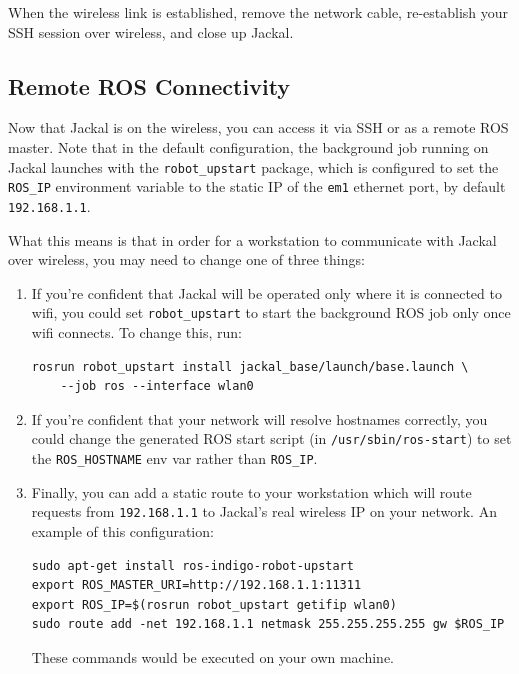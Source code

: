 \documentclass[]{clearpath-latex/clearpath-manual}
\begin{document}
When the wireless link is established, remove the network cable, re-establish your SSH
session over wireless, and close up Jackal.

\subsection{Remote ROS Connectivity}\label{remote}

Now that Jackal is on the wireless, you can access it via SSH or as a remote ROS master.
Note that in the default configuration, the background job running on Jackal launches with the 
\lstinline{robot_upstart} package, which is configured to set the \lstinline{ROS_IP}
environment variable to the static IP of the \lstinline{em1} ethernet port, by default
\lstinline{192.168.1.1}.

What this means is that in order for a workstation to communicate with Jackal over
wireless, you may need to change one of three things:

\begin{enumerate}
\item If you're confident that Jackal will be operated only where it is connected
to wifi, you could set \lstinline{robot_upstart} to start the background ROS job only
once wifi connects. To change this, run:
\begin{lstlisting}
rosrun robot_upstart install jackal_base/launch/base.launch \
    --job ros --interface wlan0
\end{lstlisting}

\item If you're confident that your network will resolve hostnames correctly, you could
change the generated ROS start script (in \lstinline{/usr/sbin/ros-start}) to set the
\lstinline{ROS_HOSTNAME} env var rather than \lstinline{ROS_IP}.

\item Finally, you can add a static route to your workstation which will route requests
from \lstinline{192.168.1.1} to Jackal's real wireless IP on your network. An example of
this configuration:
\begin{lstlisting}
sudo apt-get install ros-indigo-robot-upstart
export ROS_MASTER_URI=http://192.168.1.1:11311
export ROS_IP=$(rosrun robot_upstart getifip wlan0)
sudo route add -net 192.168.1.1 netmask 255.255.255.255 gw $ROS_IP
\end{lstlisting}
These commands would be executed on your own machine.
\end{enumerate}
\end{document}
